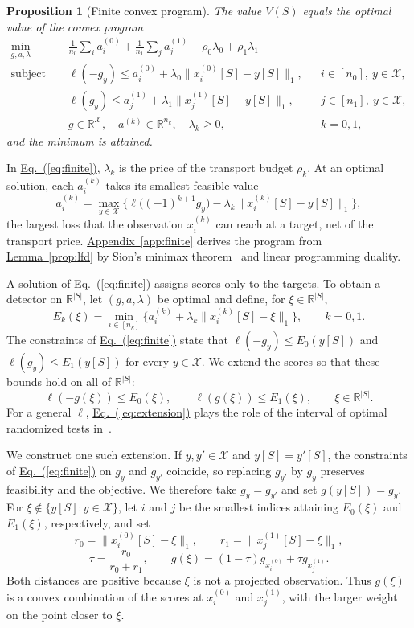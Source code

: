 \documentclass[11pt,a4paper]{article}
\newcommand{\Eqref}[1]{\hyperref[#1]{Eq.~(\ref*{#1})}}
\newcommand{\Appref}[1]{\hyperref[#1]{Appendix~\ref*{#1}}}
\newcommand{\Lemref}[1]{\hyperref[#1]{Lemma~\ref*{#1}}}
\theoremstyle{plain}
\newtheorem{proposition}{Proposition}[section]
\begin{document}
\begin{proposition}[Finite convex program]\label{prop:finite}
The value $V(S)$ equals the optimal value of the convex program
\begin{equation}\label{eq:finite}
\begin{aligned}
\min_{g,a,\lambda}\quad&
\frac1{n_0}\sum_i a_i^{(0)}+\frac1{n_1}\sum_j a_j^{(1)}
+\rho_0\lambda_0+\rho_1\lambda_1\\
\text{subject to}\quad&
\ell(-g_y)\le a_i^{(0)}+\lambda_0\|x_i^{(0)}[S]-y[S]\|_1,
&&i\in[n_0],\ y\in\mathcal X,\\
&\ell(g_y)\le a_j^{(1)}+\lambda_1\|x_j^{(1)}[S]-y[S]\|_1,
&&j\in[n_1],\ y\in\mathcal X,\\
&g\in\mathbb R^{\mathcal X},\quad a^{(k)}\in\mathbb R^{n_k},
\quad\lambda_k\ge0,&&k=0,1,
\end{aligned}
\end{equation}
and the minimum is attained.
\end{proposition}
In \Eqref{eq:finite}, $\lambda_k$ is the price of the transport budget
$\rho_k$. At an optimal solution, each $a_i^{(k)}$ takes its smallest
feasible value
\[
a_i^{(k)}=\max_{y\in\mathcal X}\bigl\{\ell\bigl((-1)^{k+1}g_y\bigr)
-\lambda_k\|x_i^{(k)}[S]-y[S]\|_1\bigr\},
\]
the largest loss that the observation $x_i^{(k)}$ can reach at a target,
net of the transport price. \Appref{app:finite} derives the program from \Lemref{prop:lfd}
by Sion's minimax theorem~\cite{sion1958minimax} and linear programming
duality.

A solution of \Eqref{eq:finite} assigns scores only to the targets. To
obtain a detector on $\mathbb R^{|S|}$, let $(g,a,\lambda)$ be optimal
and define, for $\xi\in\mathbb R^{|S|}$,
\[
E_k(\xi)=\min_{i\in[n_k]}
\bigl\{a_i^{(k)}+\lambda_k\|x_i^{(k)}[S]-\xi\|_1\bigr\},
\qquad k=0,1.
\]
The constraints of \Eqref{eq:finite} state that
$\ell(-g_y)\le E_0(y[S])$ and $\ell(g_y)\le E_1(y[S])$ for every
$y\in\mathcal X$. We extend the scores so that these bounds hold on
all of $\mathbb R^{|S|}$:
\begin{equation}\label{eq:extension}
\ell(-g(\xi))\le E_0(\xi),\qquad \ell(g(\xi))\le E_1(\xi),
\qquad\xi\in\mathbb R^{|S|}.
\end{equation}
For a general $\ell$, \Eqref{eq:extension} plays the role of the
interval of optimal randomized tests in~\cite[Theorem~1]{xie2021robust}.

We construct one such extension. If $y,y'\in\mathcal X$ and
$y[S]=y'[S]$, the constraints of \Eqref{eq:finite} on $g_y$ and
$g_{y'}$ coincide, so replacing $g_{y'}$ by $g_y$ preserves feasibility
and the objective. We therefore take $g_y=g_{y'}$ and set
$g(y[S])=g_y$. For $\xi\notin\{y[S]:y\in\mathcal X\}$, let $i$ and $j$
be the smallest indices attaining $E_0(\xi)$ and $E_1(\xi)$,
respectively, and set
\[
r_0=\|x_i^{(0)}[S]-\xi\|_1,\qquad
r_1=\|x_j^{(1)}[S]-\xi\|_1,
\]
\[
\tau=\frac{r_0}{r_0+r_1},\qquad
g(\xi)=(1-\tau)g_{x_i^{(0)}}+\tau g_{x_j^{(1)}}.
\]
Both distances are positive because $\xi$ is not a projected
observation. Thus $g(\xi)$ is a convex combination of the scores at
$x_i^{(0)}$ and $x_j^{(1)}$, with the larger weight on the point closer
to $\xi$.
\end{document}
